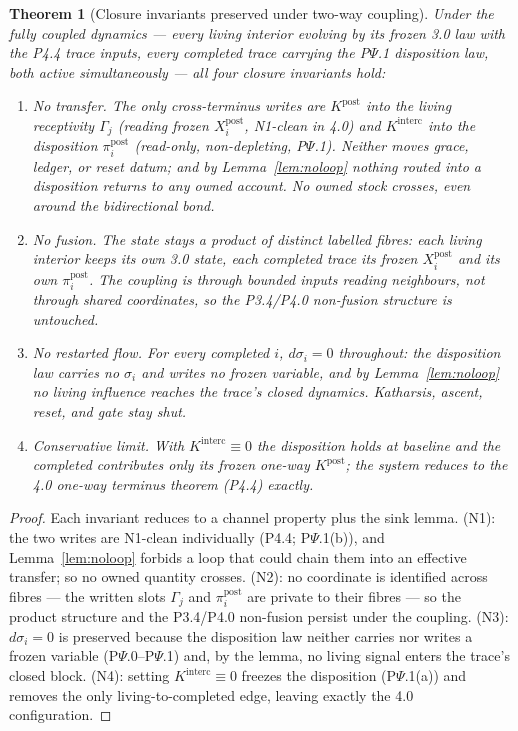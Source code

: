 \documentclass[11pt,a4paper]{article}
\theoremstyle{definition}
\theoremstyle{plain}
\newtheorem{theorem}[definition]{Theorem}
\theoremstyle{remark}
\begin{document}
\begin{theorem}[Closure invariants preserved under two-way coupling]\label{thm:psipreserve}
Under the fully coupled dynamics --- every living interior evolving by its frozen 3.0 law with
the P4.4 trace inputs, every completed trace carrying the P$\Psi$.1 disposition law, both
active simultaneously --- all four closure invariants hold:
\begin{enumerate}[label=\textup{(N\arabic*)},leftmargin=1.2cm]
\item \emph{No transfer.} The only cross-terminus writes are \(K^{\mathrm{post}}\) into the
living receptivity \(\Gamma_j\) (reading frozen \(X_i^{\mathrm{post}}\), N1-clean in 4.0) and
\(K^{\mathrm{interc}}\) into the disposition \(\pi_i^{\mathrm{post}}\) (read-only, non-depleting,
P$\Psi$.1). Neither moves grace, ledger, or reset datum; and by Lemma~\ref{lem:noloop} nothing
routed into a disposition returns to any owned account. No owned stock crosses, even around the
bidirectional bond.
\item \emph{No fusion.} The state stays a product of distinct labelled fibres: each living
interior keeps its own 3.0 state, each completed trace its frozen \(X_i^{\mathrm{post}}\) and
its own \(\pi_i^{\mathrm{post}}\). The coupling is through bounded inputs reading neighbours,
not through shared coordinates, so the P3.4/P4.0 non-fusion structure is untouched.
\item \emph{No restarted flow.} For every completed \(i\), \(d\sigma_i=0\) throughout: the
disposition law carries no \(\sigma_i\) and writes no frozen variable, and by
Lemma~\ref{lem:noloop} no living influence reaches the trace's closed dynamics. Katharsis,
ascent, reset, and gate stay shut.
\item \emph{Conservative limit.} With \(K^{\mathrm{interc}}\equiv0\) the disposition holds at
baseline and the completed contributes only its frozen one-way \(K^{\mathrm{post}}\); the system
reduces to the 4.0 one-way terminus theorem (P4.4) exactly.
\end{enumerate}
\end{theorem}

\begin{proof}
Each invariant reduces to a channel property plus the sink lemma. (N1): the two writes are
N1-clean individually (P4.4; P$\Psi$.1(b)), and Lemma~\ref{lem:noloop} forbids a loop that
could chain them into an effective transfer; so no owned quantity crosses. (N2): no coordinate
is identified across fibres --- the written slots \(\Gamma_j\) and \(\pi_i^{\mathrm{post}}\) are
private to their fibres --- so the product structure and the P3.4/P4.0 non-fusion persist under
the coupling. (N3): \(d\sigma_i=0\) is preserved because the disposition law neither carries nor
writes a frozen variable (P$\Psi$.0--P$\Psi$.1) and, by the lemma, no living signal enters the
trace's closed block. (N4): setting \(K^{\mathrm{interc}}\equiv0\) freezes the disposition
(P$\Psi$.1(a)) and removes the only living-to-completed edge, leaving exactly the 4.0
configuration. \qedhere
\end{proof}
\end{document}
